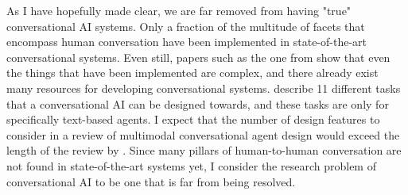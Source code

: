 \documentclass[11pt]{article}
\begin{document}
As I have hopefully made clear, we are far removed from having "true" conversational AI systems.
Only a fraction of the multitude of facets that encompass human conversation have been implemented in state-of-the-art conversational systems.
Even still, papers such as the one from \citet{kumar2024dialogue} show that even the things that have been implemented are complex, and there already exist many resources for developing conversational systems.
\citeauthor{kumar2024dialogue} describe 11 different tasks that a conversational AI can be designed towards, and these tasks are only for specifically text-based agents.
I expect that the number of design features to consider in a review of multimodal conversational agent design would exceed the length of the review by \citeauthor{kumar2024dialogue}.
Since many pillars of human-to-human conversation are not found in state-of-the-art systems yet, I consider the research problem of conversational AI to be one that is far from being resolved.


\end{document}
